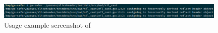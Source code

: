 \begin{figure}[t!] %
    \centering
    \includegraphics[width=\textwidth]{assets/images/chapter5/go-safer-screenshot.png}
    \caption{Usage example screenshot of \toolSafer{}}
    \label{fig:safer-screenshot}
\end{figure}
